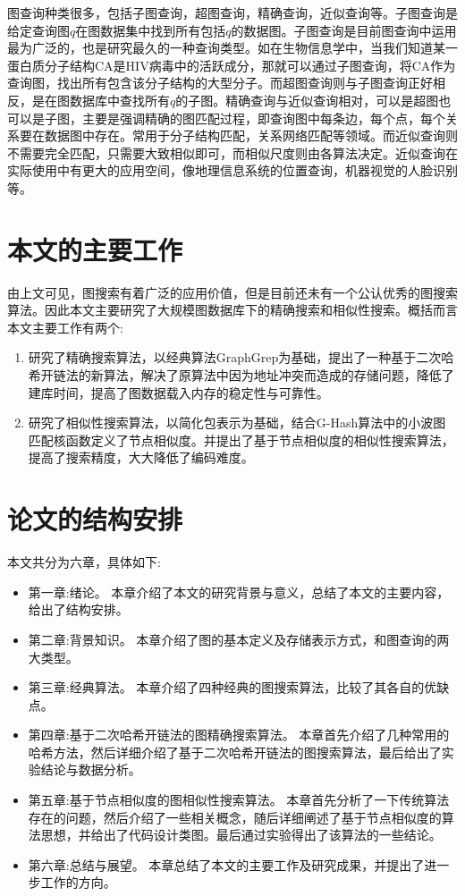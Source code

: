 \documentclass{XDBAthesis}
\begin{document}
图查询种类很多，包括子图查询，超图查询，精确查询，近似查询等\cite{g13}。子图查询是给定查询图$q$在图数据集中找到所有包括$q$的数据图。子图查询是目前图查询中运用最为广泛的，也是研究最久的一种查询类型。如在生物信息学中\cite{g13}，当我们知道某一蛋白质分子结构CA是HIV病毒中的活跃成分，那就可以通过子图查询，将CA作为查询图，找出所有包含该分子结构的大型分子。而超图查询则与子图查询正好相反，是在图数据库中查找所有$q$的子图。精确查询与近似查询相对，可以是超图也可以是子图，主要是强调精确的图匹配过程，即查询图中每条边，每个点，每个关系要在数据图中存在。常用于分子结构匹配，关系网络匹配等领域。而近似查询则不需要完全匹配，只需要大致相似即可，而相似尺度则由各算法决定。近似查询在实际使用中有更大的应用空间，像地理信息系统的位置查询，机器视觉的人脸识别等。

\section{本文的主要工作}
由上文可见，图搜索有着广泛的应用价值，但是目前还未有一个公认优秀的图搜索算法。因此本文主要研究了大规模图数据库下的精确搜索和相似性搜索。概括而言本文主要工作有两个:
\begin{enumerate}
    \item 研究了精确搜索算法，以经典算法GraphGrep\cite{graphgrep}为基础，提出了一种基于二次哈希开链法的新算法，解决了原算法中因为地址冲突而造成的存储问题，降低了建库时间，提高了图数据载入内存的稳定性与可靠性。
    \item 研究了相似性搜索算法，以简化包表示为基础，结合G-Hash\cite{ghash}算法中的小波图匹配核函数定义了节点相似度。并提出了基于节点相似度的相似性搜索算法，提高了搜索精度，大大降低了编码难度。
\end{enumerate}
\section{论文的结构安排}
本文共分为六章，具体如下:
\begin{itemize}
    \item 第一章:绪论。 本章介绍了本文的研究背景与意义，总结了本文的主要内容，给出了结构安排。
    \item 第二章:背景知识。 本章介绍了图的基本定义及存储表示方式，和图查询的两大类型。
    \item 第三章:经典算法。 本章介绍了四种经典的图搜索算法，比较了其各自的优缺点。
    \item 第四章:基于二次哈希开链法的图精确搜索算法。 本章首先介绍了几种常用的哈希方法，然后详细介绍了基于二次哈希开链法的图搜索算法，最后给出了实验结论与数据分析。
    \item 第五章:基于节点相似度的图相似性搜索算法。 本章首先分析了一下传统算法存在的问题，然后介绍了一些相关概念，随后详细阐述了基于节点相似度的算法思想，并给出了代码设计类图。最后通过实验得出了该算法的一些结论。
    \item 第六章:总结与展望。 本章总结了本文的主要工作及研究成果，并提出了进一步工作的方向。
\end{itemize}



\ifx\allfiles\undefined
\renewcommand\refname{参考文献}
%

\end{document}
